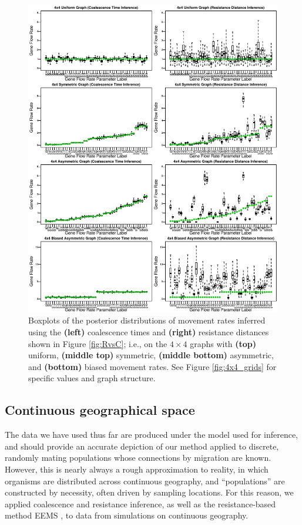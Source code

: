 \documentclass{article}
\begin{document}
\begin{figure}
\centering
     \includegraphics[scale=1]{figs/4x4coalvcom_paper}
    \caption{
        Boxplots of the posterior distributions of movement rates
        inferred using the
        \textbf{(left)} coalescence times
        and \textbf{(right)} resistance distances
        shown in Figure \ref{fig:RvsC};
        i.e., on the $4 \times 4$ graphs with
        \textbf{(top)} uniform,
        \textbf{(middle top)} symmetric,
        \textbf{(middle bottom)} asymmetric,
        and \textbf{(bottom)} biased
        movement rates.
        See Figure \ref{fig:4x4_grids} for specific values and graph structure.
    \label{fig:4x4box}
}
\end{figure}


\subsection*{Continuous geographical space}

The data we have used thus far are produced under the model used for inference,
and should provide an accurate depiction of our method applied to discrete, randomly mating populations
whose connections by migration are known.
However, this is nearly always a rough approximation to reality,
in which organisms are distributed across continuous geography,
and ``populations'' are constructed by necessity, often driven by sampling locations.
For this reason, we applied coalescence and resistance inference,
as well as the resistance-based method EEMS \citep{petkova2016visualizing},
to data from simulations on continuous geography.
\end{document}
